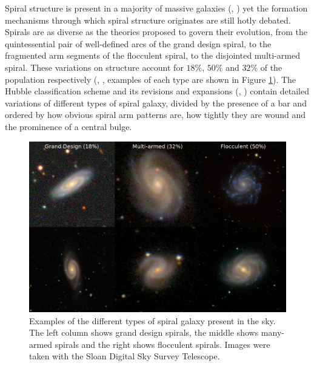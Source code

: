 
Spiral structure is present in a majority of massive galaxies (\citealt{1989gadv.book..151B}, \citealt{2008MNRAS.389.1179L}) yet the formation mechanisms through which spiral structure originates are still hotly debated. Spirals are as diverse as the theories proposed to govern their evolution, from the quintessential pair of well-defined arcs of the grand design spiral, to the fragmented arm segments of the flocculent spiral, to the disjointed multi-armed spiral. These variations on structure account for $18\%$, $50\%$ and $32\%$ of the population respectively (\citealt{2011ApJ...737...32E}, \citealt{2015yCat..22170032B}, examples of each type are shown in Figure \ref{fig:spiral-galaxy-types}). The Hubble classification scheme \citep{1926ApJ....64..321H} and its revisions and expansions (\citealt{1961hag..book.....S}, \citealt{1991rc3..book.....D}) contain detailed variations of different types of spiral galaxy, divided by the presence of a bar and ordered by how obvious spiral arm patterns are, how tightly they are wound and the prominence of a central bulge.

\begin{figure}
  \includegraphics[width=13cm]{plots/galaxy_types.png}
  \caption{Examples of the different types of spiral galaxy present in the sky. The left column shows grand design spirals, the middle shows many-armed spirals and the right shows flocculent spirals. Images were taken with the Sloan Digital Sky Survey Telescope.}
  \label{fig:spiral-galaxy-types}
\end{figure}

